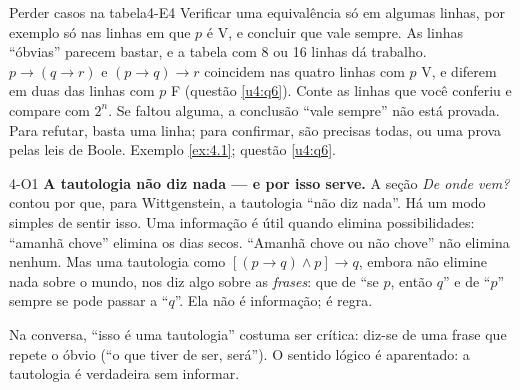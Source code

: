 \begin{erro}{Perder casos na tabela}{4-E4}
 Verificar uma equivalência só em algumas linhas, por exemplo só nas linhas em que $p$ é V, e concluir que vale sempre.
 As linhas \enquote{óbvias} parecem bastar, e a tabela com 8 ou 16 linhas dá trabalho.
 $p\rightarrow(q\rightarrow r)$ e $(p\rightarrow q)\rightarrow r$ coincidem nas quatro linhas com $p$ V, e diferem em duas das linhas com $p$ F (questão \ref{u4:q6}).
 Conte as linhas que você conferiu e compare com $2^n$. Se faltou alguma, a conclusão \enquote{vale sempre} não está provada.
 Para refutar, basta uma linha; para confirmar, são precisas todas, ou uma prova pelas leis de Boole.
 Exemplo \ref{ex:4.1}; questão \ref{u4:q6}.
\end{erro}

\Observacoes

\begin{obs}{4-O1}
\textbf{A tautologia não diz nada — e por isso serve.} A seção \emph{De onde vem?} contou por que, para Wittgenstein, a tautologia \enquote{não diz nada}. Há um modo simples de sentir isso. Uma informação é útil quando elimina possibilidades: \enquote{amanhã chove} elimina os dias secos. \enquote{Amanhã chove ou não chove} não elimina nenhum. Mas uma tautologia como $[(p\rightarrow q)\wedge p]\rightarrow q$, embora não elimine nada sobre o mundo, nos diz algo sobre as \emph{frases}: que de \enquote{se $p$, então $q$} e de \enquote{$p$} sempre se pode passar a \enquote{$q$}. Ela não é informação; é regra.

Na conversa, \enquote{isso é uma tautologia} costuma ser crítica: diz-se de uma frase que repete o óbvio (\enquote{o que tiver de ser, será}). O sentido lógico é aparentado: a tautologia é verdadeira sem informar.
\end{obs}


